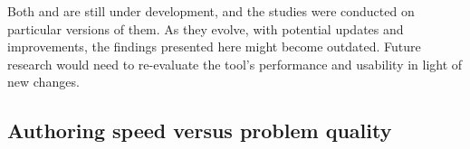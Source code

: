 

Both \Penrose and \Edgeworth are still under development, and the studies were conducted on particular versions of them. As they evolve, with potential updates and improvements, the findings presented here might become outdated. Future research would need to re-evaluate the tool's performance and usability in light of new changes. 

\subsection{Authoring speed versus problem quality}

